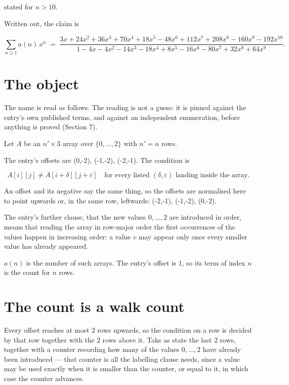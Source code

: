 \documentclass[11pt]{article}
\theoremstyle{definition}
\begin{document}
stated for $n > 10$.

Written out, the claim is

\[\sum_{n \ge 1} a(n)\,x^n \;=\; \frac{3x + 24x^{2} + 36x^{3} + 70x^{4} + 18x^{5} - 48x^{6} + 112x^{7} + 208x^{8} - 160x^{9} - 192x^{10}}{1 - 4x - 4x^{2} - 14x^{3} - 18x^{4} + 8x^{5} - 16x^{6} - 80x^{7} + 32x^{8} + 64x^{9}}.\]

\section{The object}

The name is read as follows. The reading is not a guess: it is pinned against the entry's own published terms, and against an independent enumeration, before anything is proved (Section 7).

Let $A$ be an $n' \times 3$ array over $\{0,\dots,2\}$ with $n' = n$ rows.

The entry's offsets are (0,-2), (-1,-2), (-2,-1). The condition is

\[A[i][j] \ne A[i{+}\delta][j{+}\varepsilon]\quad\text{for every listed }(\delta,\varepsilon)\text{ landing inside the array.}\]

An offset and its negative say the same thing, so the offsets are normalised here to point upwards or, in the same row, leftwards: (-2,-1), (-1,-2), (0,-2).

The entry's further clause, that the new values $0,\dots,2$ are introduced in order, means that reading the array in row-major order the first occurrences of the values happen in increasing order: a value $v$ may appear only once every smaller value has already appeared.

$a(n)$ is the number of such arrays. The entry's offset is 1, so its term of index $n$ is the count for $n$ rows.

\section{The count is a walk count}

Every offset reaches at most $2$ rows upwards, so the condition on a row is decided by that row together with the $2$ rows above it. Take as state the last $2$ rows, together with a counter recording how many of the values $0,\dots,2$ have already been introduced --- that counter is all the labelling clause needs, since a value may be used exactly when it is smaller than the counter, or equal to it, in which case the counter advances.
\end{document}
